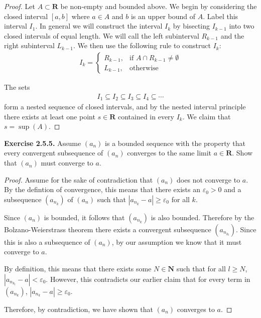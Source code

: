 \documentclass{article}
\begin{document}
\begin{proof}
    Let $A \subset \mathbf{R}$ be non-empty and bounded above. We begin by considering the closed interval $[a, b]$ where $a \in A$ and
    $b$ is an upper bound of $A$. Label this interval $I_1$. In general we will construct the interval $I_k$ by bisecting $I_{k-1}$ into
    two closed intervals of equal length. We will call the left subinterval $R_{k-1}$ and the right subinterval $L_{k-1}$. We then use the
    following rule to construct $I_k$:
    \begin{align*}
        I_k = 
        \begin{cases} 
        R_{k-1}, & \text{if } A \cap R_{k-1} \ne \emptyset \\
        L_{k-1}, & \text{otherwise}
    \end{cases}
    \end{align*}

    The sets
    \begin{align*}
        I_1 \subseteq  I_2 \subseteq I_3 \subseteq  I_4 \subseteq \cdots
    \end{align*}
    form a nested sequence of closed intervals, and by the nested interval principle there exists at least one point $s \in \mathbf{R}$ contained
    in every $I_k$. We claim that $s = \sup(A)$.
\end{proof}

\textbf{Exercise 2.5.5.} Assume $(a_n)$ is a bounded sequence with the property that every convergent subsequence of $(a_n)$ converges
to the same limit $a \in \textbf{R}$. Show that $(a_n)$ must converge to $a$.

\begin{proof}
    Assume for the sake of contradiction that $(a_n)$ does not converge to $a$. By the defintion of convergence, this means that
    there exists an $\varepsilon_0 > 0$ and a subsequence $(a_{n_k})$ of $(a_n)$ such that $|a_{n_k} - a| \ge \varepsilon_0$ for all $k$.

    Since $(a_n)$ is bounded, it follows that $(a_{n_k})$ is also bounded. Therefore by the Bolzano-Weierstrass theorem there exists a convergent
    subsequence $(a_{n_{k_l}})$. Since this is also a subsequence of $(a_n)$, by our assumption we know that it must converge to $a$.

    By definition, this means that there exists some $N \in \textbf{N}$ such that for all $l \ge N$, $|a_{n_{k_l}} - a| < \varepsilon_0$. However,
    this contradicts our earlier claim that for every term in $(a_{n_k})$, $|a_{n_k} - a| \ge \varepsilon_0$.
    
    Therefore, by contradiction, we have shown that $(a_n)$ converges to $a$.
\end{proof}
\end{document}
